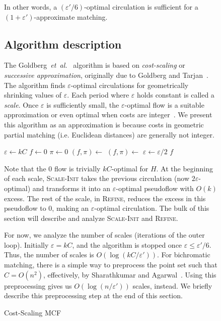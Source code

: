 \documentclass[11pt]{article}
\def\etal{\textsl{et~al.}}
\def\eps{\varepsilon}
\theoremstyle{plain}
\begin{document}
\begin{figure*}
In other words, a $(\eps'/6)$-optimal circulation is sufficient for a
$(1 + \eps')$-approximate matching.

\subsection{Algorithm description}

The Goldberg~{\etal}~\cite{GHKT17} algorithm is based on \emph{cost-scaling} or
\emph{successive approximation}, originally due to Goldberg and
Tarjan~\cite{GT90}.
The algorithm finds $\eps$-optimal circulations for geometrically shrinking
values of $\eps$.
Each period where $\eps$ holds constant is called a \emph{scale}.
Once $\eps$ is sufficiently small, the $\eps$-optimal flow is a suitable
approximation or even optimal when costs are integer~\cite{GT90,GHKT17}.
We present this algorithm as an approximation is because costs in geometric
partial matching (i.e. Euclidean distances) are generally not integer.

\begin{algorithm}
\caption{Cost-Scaling MCF}
\begin{algorithmic}[1]
\Function{MCF}{$H$, $\eps'$}
	\State $\eps \gets kC$
	\State $f \gets 0$
	\State $\pi \gets 0$
	\Repeat
		\State $(f, \pi) \gets$ 
		\State $(f, \pi) \gets$ 
		\State $\eps \gets \eps/2$
	\Until{$\eps \leq \eps'/6$}
	\State\Return $f$
\EndFunction
\end{algorithmic}
\end{algorithm}

Note that the 0 flow is trivially $kC$-optimal for $H$.
At the beginning of each scale, \textsc{Scale-Init} takes the previous
circulation (now $2\eps$-optimal) and transforms it into an $\eps$-optimal
pseudoflow with $O(k)$ excess.
The rest of the scale, in \textsc{Refine}, reduces the excess in this
pseudoflow to 0, making an $\eps$-optimal circulation.
The bulk of this section will describe and analyze \textsc{Scale-Init} and
\textsc{Refine}.

For now, we analyze the number of scales (iterations of the outer loop).
Initially $\eps = kC$, and the algorithm is stopped once $\eps \leq \eps'/6$.
Thus, the number of scales is $O(\log(kC/\eps'))$.
For bichromatic matching, there is a simple way to preprocess the point set
such that $C = O(n^2)$, effectively, by Sharathkumar and Agarwal~\cite{SA12}.
Using this preprocessing gives us $O(\log(n/\eps'))$ scales, instead.
We briefly describe this preprocessing step at the end of this section.


\end{figure*}
\end{document}
